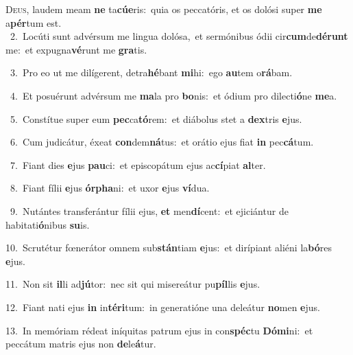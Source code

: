 \lettrine{\initial\textcolor{\initialcolor}{D}}{eus,} laudem meam \textbf{ne} ta\-\textbf{cú}\-\textbf{e}ris:~\star quia os peccatóris, et os dolósi super \textbf{me} a\-\textbf{pér}\-tum est.\\
{\numbfont\textcolor{\numbcolor}{~2.}}~Locúti sunt advérsum me lingua dolósa,~\dagger et sermónibus ódii cir\-\textbf{cum}\-de\-\textbf{dé}\-\textbf{runt} me:~\star et expugna\-\textbf{vé}\-runt me \textbf{gra}\-tis.\par
{\numbfont\textcolor{\numbcolor}{~3.}}~Pro eo ut me dilígerent, detra\-\textbf{hé}\-bant \textbf{mi}\-hi:~\star ego \textbf{au}\-tem o\-\textbf{rá}\-bam.\par
{\numbfont\textcolor{\numbcolor}{~4.}}~Et posuérunt advérsum me \textbf{ma}\-la pro \textbf{bo}\-nis:~\star et ódium pro dilecti\-\textbf{ó}\-ne \textbf{me}\-a.\par
{\numbfont\textcolor{\numbcolor}{~5.}}~Constítue super eum \textbf{pec}\-ca\-\textbf{tó}\-rem:~\star et diábolus stet a \textbf{dex}\-tris \textbf{e}\-jus.\par
{\numbfont\textcolor{\numbcolor}{~6.}}~Cum judicátur, éxeat \textbf{con}\-dem\-\textbf{ná}\-tus:~\star et orátio ejus fiat \textbf{in} pec\-\textbf{cá}\-tum.\par
{\numbfont\textcolor{\numbcolor}{~7.}}~Fiant dies \textbf{e}\-jus \textbf{pau}\-ci:~\star et episcopátum ejus ac\-\textbf{cí}\-piat \textbf{al}\-ter.\par
{\numbfont\textcolor{\numbcolor}{~8.}}~Fiant fílii \textbf{e}\-jus \textbf{ór}\-\textbf{pha}ni:~\star et uxor \textbf{e}\-jus \textbf{ví}\-dua.\par
{\numbfont\textcolor{\numbcolor}{~9.}}~Nutántes transferántur fílii ejus, \textbf{et} men\-\textbf{dí}\-cent:~\star et ejiciántur de habitati\-\textbf{ó}\-nibus \textbf{su}\-is.\par
{\numbfont\textcolor{\numbcolor}{10.}}~Scrutétur fœnerátor omnem sub\-\textbf{stán}\-tiam \textbf{e}\-jus:~\star et dirípiant aliéni la\-\textbf{bó}\-res \textbf{e}\-jus.\par
{\numbfont\textcolor{\numbcolor}{11.}}~Non sit \textbf{il}\-li ad\-\textbf{jú}\-tor:~\star nec sit qui misereátur pu\-\textbf{píl}\-lis \textbf{e}\-jus.\par
{\numbfont\textcolor{\numbcolor}{12.}}~Fiant nati ejus \textbf{in} in\-\textbf{tér}\-\textbf{i}tum:~\star in generatióne una deleátur \textbf{no}\-men \textbf{e}\-jus.\par
{\numbfont\textcolor{\numbcolor}{13.}}~In memóriam rédeat iníquitas patrum ejus in con\-\textbf{spéc}\-tu \textbf{Dó}\-\textbf{mi}ni:~\star et peccátum matris ejus non \textbf{de}\-le\-\textbf{á}\-tur.\par
